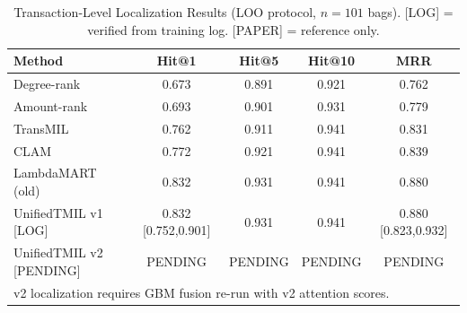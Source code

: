 \begin{table}[t]
\centering
\caption{Transaction-Level Localization Results (LOO protocol, $n=101$ bags).
[LOG] = verified from training log. [PAPER] = reference only.}
\label{tab:tx_results}
\begin{tabular}{lcccc}
\hline
Method & Hit@1 & Hit@5 & Hit@10 & MRR \\
\hline
Degree-rank & 0.673 & 0.891 & 0.921 & 0.762 \\
Amount-rank & 0.693 & 0.901 & 0.931 & 0.779 \\
TransMIL & 0.762 & 0.911 & 0.941 & 0.831 \\
CLAM & 0.772 & 0.921 & 0.941 & 0.839 \\
LambdaMART (old) & 0.832 & 0.931 & 0.941 & 0.880 \\
\hline
UnifiedTMIL v1 [LOG] & 0.832 [0.752,0.901] & 0.931 & 0.941 & 0.880 [0.823,0.932] \\
UnifiedTMIL v2 [PENDING] & PENDING & PENDING & PENDING & PENDING \\
\hline
\multicolumn{5}{l}{\small v2 localization requires GBM fusion re-run with v2 attention scores.} \\
\end{tabular}
\end{table}
